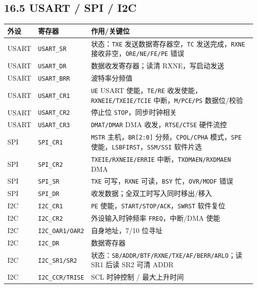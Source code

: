 \documentclass[UTF8,zihao=-5]{ctexart}
\renewcommand{\arraystretch}{0.9}
\begin{document}
\begin{multicols*}{2}
\subsection*{16.5 USART / SPI / I2C}
{\scriptsize\setlength{\tabcolsep}{1.8pt}\renewcommand{\arraystretch}{0.88}%
\begin{tabularx}{\linewidth}{@{}*{3}{Y}@{}}
\toprule
\textbf{外设} & \textbf{寄存器} & \textbf{作用/关键位} \\
\midrule
USART & \texttt{USART\_SR} & 状态：\texttt{TXE} 发送数据寄存器空，\texttt{TC} 发送完成，\texttt{RXNE} 接收非空，\texttt{ORE/NE/FE/PE} 错误 \\
USART & \texttt{USART\_DR} & 数据收发寄存器；读清 RXNE，写启动发送 \\
USART & \texttt{USART\_BRR} & 波特率分频值 \\
USART & \texttt{USART\_CR1} & \texttt{UE} USART 使能，\texttt{TE/RE} 收发使能，\texttt{RXNEIE/TXEIE/TCIE} 中断，\texttt{M/PCE/PS} 数据位/校验 \\
USART & \texttt{USART\_CR2} & 停止位 \texttt{STOP}，同步时钟相关 \\
USART & \texttt{USART\_CR3} & \texttt{DMAT/DMAR} DMA 收发，\texttt{RTSE/CTSE} 硬件流控 \\
SPI & \texttt{SPI\_CR1} & \texttt{MSTR} 主机，\texttt{BR[2:0]} 分频，\texttt{CPOL/CPHA} 模式，\texttt{SPE} 使能，\texttt{LSBFIRST}，\texttt{SSM/SSI} 软件片选 \\
SPI & \texttt{SPI\_CR2} & \texttt{TXEIE/RXNEIE/ERRIE} 中断，\texttt{TXDMAEN/RXDMAEN} DMA \\
SPI & \texttt{SPI\_SR} & \texttt{TXE} 可写，\texttt{RXNE} 可读，\texttt{BSY} 忙，\texttt{OVR/MODF} 错误 \\
SPI & \texttt{SPI\_DR} & 收发数据；全双工时写入同时移出/移入 \\
I2C & \texttt{I2C\_CR1} & \texttt{PE} 使能，\texttt{START/STOP/ACK}，\texttt{SWRST} 软件复位 \\
I2C & \texttt{I2C\_CR2} & 外设输入时钟频率 \texttt{FREQ}，中断/DMA 使能 \\
I2C & \texttt{I2C\_OAR1/OAR2} & 自身地址，7/10 位寻址 \\
I2C & \texttt{I2C\_DR} & 数据寄存器 \\
I2C & \texttt{I2C\_SR1/SR2} & 状态：\texttt{SB/ADDR/BTF/RXNE/TXE/AF/BERR/ARLO}；读 SR1 后读 SR2 可清 ADDR \\
I2C & \texttt{I2C\_CCR/TRISE} & SCL 时钟控制 / 最大上升时间 \\
\bottomrule
\end{tabularx}}

\end{multicols*}
\end{document}
